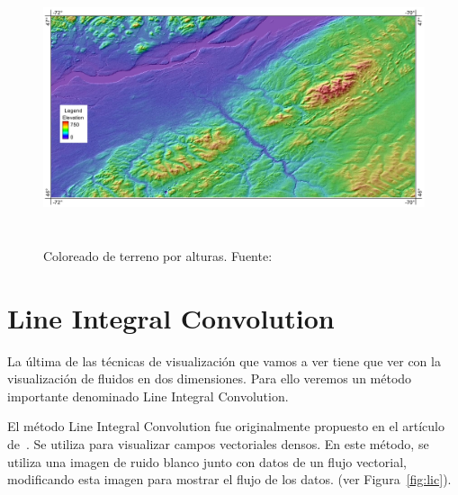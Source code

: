 \begin{figure}[!ht]
	\centering	
	\includegraphics[height=8cm]{figures/terraincoloring.jpg}
	\caption[Coloreado de terreno por alturas.]{Coloreado de terreno por
	alturas. Fuente:~\cite{terraincoloringimage}}
	\label{fig:terrain}
\end{figure}

\section{Line Integral Convolution}
\label{ref:lic}

La última de las técnicas de visualización que vamos a ver tiene que ver con la
visualización de fluidos en dos dimensiones. Para ello veremos un método
importante denominado Line Integral Convolution.

El método Line Integral Convolution fue originalmente propuesto en el artículo
de~\citet{osti_10185520}. Se utiliza para visualizar campos vectoriales densos.
En este método, se utiliza una imagen de ruido blanco junto con datos de un
flujo vectorial, modificando esta imagen para mostrar el flujo de los datos.
(ver Figura~\ref{fig:lic}). 

